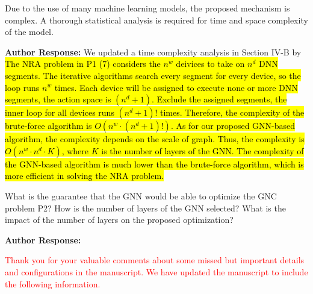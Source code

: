 \documentclass{ar2rc}
\begin{document}
\begin{tcolorbox}[
   title={Reviewer 3: Comment 3},
   colback=gray!10,%
   colframe=black,%
   width=\linewidth,%
   arc=1mm, auto outer arc,
   boxrule=0.5pt,
]
Due to the use of many machine learning models, the proposed mechanism is complex. A thorough statistical analysis is required for time and space complexity of the model.
\end{tcolorbox}

\textbf{Author Response:}
We updated a time complexity analysis in Section IV-B by 
\hl{The NRA problem in P1 (7) considers the $n^{w}$ deivices to take on $n^{d}$ DNN segments. The iterative algorithms search every segment for every device, so the loop runs $n^{w}$ times. Each device will be assigned to execute none or more DNN segments, the action space is $(n^{d}+1)$. Exclude the assigned segments, the inner loop for all devices runs $(n^{d}+1)!$ times. Therefore, the complexity of the brute-force algorithm is $O(n^{w} \cdot (n^{d}+1)!)$. As for our proposed GNN-based algorithm, the complexity depends on the scale of graph. Thus, the complexity is $O(n^{w} \cdot n^{d} \cdot K)$, where $K$ is the number of layers of the GNN. The complexity of the GNN-based algorithm is much lower than the brute-force algorithm, which is more efficient in solving the NRA problem.}

\begin{tcolorbox}[
   title={Reviewer 3: Comment 4},
   colback=gray!10,%
   colframe=black,%
   width=\linewidth,%
   arc=1mm, auto outer arc,
   boxrule=0.5pt,
]

What is the guarantee that the GNN would be able to optimize the GNC problem P2? How is the number of layers of the GNN selected? What is the impact of the number of layers on the proposed optimization?
\end{tcolorbox}

\textbf{Author Response:}

\textcolor{red}{Thank you for your valuable comments about some missed but important details and configurations in the manuscript. We have updated the manuscript to include the following information.}
\end{document}
